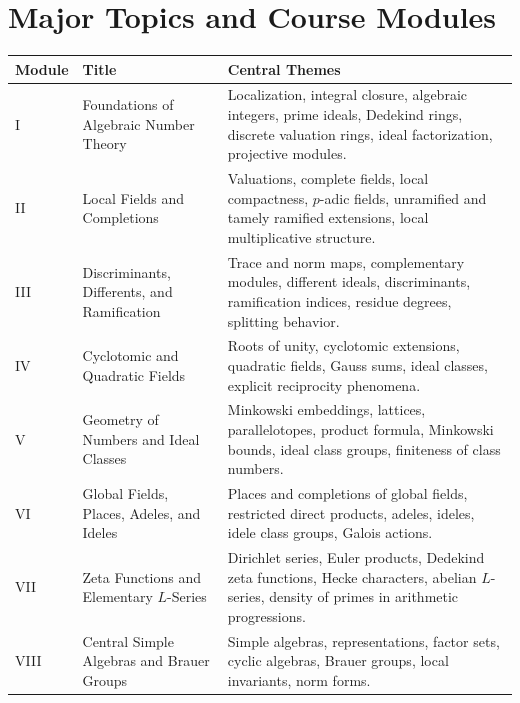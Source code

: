 \documentclass[11pt]{article}
\begin{document}
\section{Major Topics and Course Modules}

\begin{longtable}{p{}p{}p{}}
\toprule
\textbf{Module} & \textbf{Title} & \textbf{Central Themes} \\
\midrule
\endhead

I &
Foundations of Algebraic Number Theory &
Localization, integral closure, algebraic integers, prime ideals, Dedekind rings, discrete valuation rings, ideal factorization, projective modules. \\

II &
Local Fields and Completions &
Valuations, complete fields, local compactness, $p$-adic fields, unramified and tamely ramified extensions, local multiplicative structure. \\

III &
Discriminants, Differents, and Ramification &
Trace and norm maps, complementary modules, different ideals, discriminants, ramification indices, residue degrees, splitting behavior. \\

IV &
Cyclotomic and Quadratic Fields &
Roots of unity, cyclotomic extensions, quadratic fields, Gauss sums, ideal classes, explicit reciprocity phenomena. \\

V &
Geometry of Numbers and Ideal Classes &
Minkowski embeddings, lattices, parallelotopes, product formula, Minkowski bounds, ideal class groups, finiteness of class numbers. \\

VI &
Global Fields, Places, Adeles, and Ideles &
Places and completions of global fields, restricted direct products, adeles, ideles, idele class groups, Galois actions. \\

VII &
Zeta Functions and Elementary $L$-Series &
Dirichlet series, Euler products, Dedekind zeta functions, Hecke characters, abelian $L$-series, density of primes in arithmetic progressions. \\

VIII &
Central Simple Algebras and Brauer Groups &
Simple algebras, representations, factor sets, cyclic algebras, Brauer groups, local invariants, norm forms. \\


\end{longtable}
\end{document}
